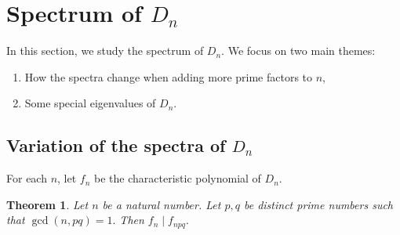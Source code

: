 \documentclass[11pt,a4paper]{amsart}
\newtheorem{thm}{Theorem}[section]
\theoremstyle{definition}
\newtheorem{rem}[thm]{Remark}
\numberwithin{equation}{section}
\begin{document}

\section{Spectrum of $D_n$} \label{sec:spectrum}
In this section, we study the spectrum of $D_n$. We focus on two main themes: 
\begin{enumerate}
\item How the spectra change when adding more prime factors to $n$, 
\item Some special eigenvalues of $D_n.$

\end{enumerate}

\subsection{Variation of the spectra of $D_n$}
For each $n$, let $f_n$ be the characteristic polynomial of $D_n.$
\begin{thm} \label{thm:main}
    Let $n$ be a natural number. Let $p,q$ be distinct prime numbers such that $\gcd(n,pq)=1.$ Then $f_{n} \mid f_{npq}.$
\end{thm}
\end{document}
